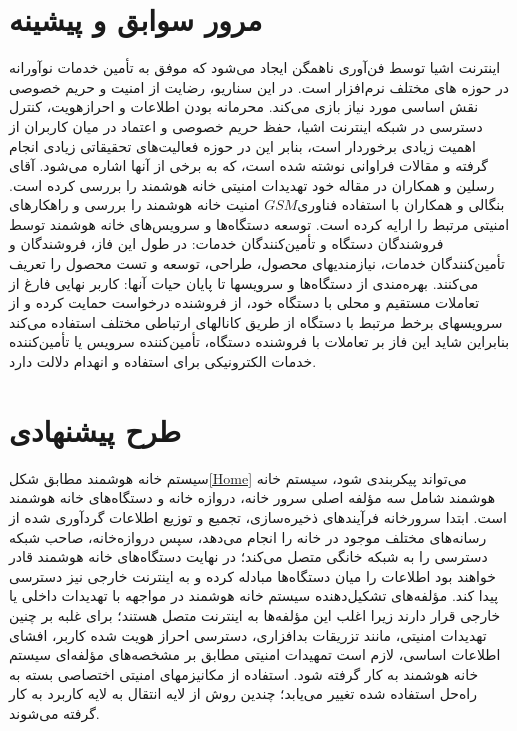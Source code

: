 \documentclass[aimcpersian]{aimc46}
\begin{document}
\section{مرور سوابق و پیشینه}
اینترنت اشیا توسط فن‌آوری ناهمگن ایجاد می‌شود که موفق به تأمین خدمات نوآورانه در حوزه های مختلف نرم‌افزار است. در این سناریو، رضایت از امنیت و حریم خصوصی نقش اساسی مورد نیاز بازی می‌کند. محرمانه بودن اطلاعات و احرازهویت، کنترل دسترسی در شبکه اینترنت اشیا، حفظ حریم خصوصی و اعتماد در میان کاربران از اهمیت زیادی برخوردار است، بنابر این در حوزه فعالیت‌های تحقیقاتی زیادی انجام گرفته و مقالات فراوانی نوشته شده است، که به برخی از آنها اشاره می‌شود. آقای رسلین و همکاران\cite{M1} در مقاله خود تهدیدات امنیتی خانه هوشمند را بررسی کرده است. بنگالی و همکاران\cite{M2} با استفاده فناوری$GSM$ امنیت خانه هوشمند را بررسی و راهکارهای امنیتی مرتبط را ارایه کرده است. 
توسعه دستگاه‌ها و سرویس‌های خانه هوشمند توسط فروشندگان دستگاه و تأمین‌کنندگان خدمات: در طول این فاز، فروشندگان و تأمین‌کنندگان خدمات، نیازمندیهای محصول، طراحی، توسعه و تست محصول را تعریف می‌کنند. 
بهره‌مندی از دستگاه‌ها و سرویسها تا پایان حیات آنها: کاربر نهایی فارغ از تعاملات مستقیم و محلی با دستگاه خود، از فروشنده درخواست حمایت کرده و از سرویسهای برخط مرتبط با دستگاه از طریق کانالهای ارتباطی مختلف استفاده می‌کند بنابراین شاید این فاز بر تعاملات با فروشنده دستگاه، تأمین‌کننده سرویس یا تأمین‌کننده خدمات الکترونیکی برای استفاده و انهدام دلالت دارد.

\section{طرح پیشنهادی}

سیستم خانه هوشمند مطابق شکل\ref{Home} می‌تواند پیکربندی شود، سیستم خانه هوشمند شامل سه مؤلفه اصلی سرور خانه، دروازه خانه و دستگاه‌های خانه هوشمند است.
ابتدا سرور‌خانه فرآیندهای ذخیره‌سازی، تجمیع و توزیع اطلاعات گردآوری شده از رسانه‌های مختلف موجود در خانه را انجام می‌دهد، سپس دروازه‌خانه، صاحب شبکه دسترسی را به شبکه خانگی متصل می‌کند؛ در نهایت دستگاه‌های خانه هوشمند قادر خواهند بود اطلاعات را میان دستگاه‌ها مبادله کرده و به اینترنت خارجی نیز دسترسی پیدا کند. 
مؤلفه‌های تشکیل‌دهنده سیستم خانه هوشمند در مواجهه با تهدیدات داخلی یا خارجی قرار دارند زیرا اغلب این مؤلفه‌ها به اینترنت متصل هستند؛ برای غلبه بر چنین تهدیدات امنیتی، مانند تزریقات بدافزاری، دسترسی احراز هویت شده کاربر، افشای اطلاعات اساسی، لازم است تمهیدات امنیتی مطابق بر مشخصه‌های مؤلفه‌ای سیستم خانه هوشمند به کار گرفته شود. استفاده از مکانیزمهای امنیتی اختصاصی بسته به راه‌حل استفاده شده تغییر می‌یابد؛ چندین روش از لایه انتقال به لایه کاربرد به کار گرفته می‌شوند.
\end{document}
